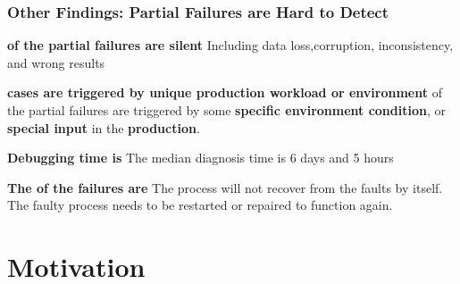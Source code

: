\documentclass[aspectratio=169]{beamer}
\newcommand{\red}[1]{{\color{red}{#1}}}
\begin{document}
\begin{frame}
    \frametitle{Other Findings: Partial Failures are Hard to Detect}
    \begin{block}{\textbf{\red{15\%} of the partial failures are silent}}
        Including data loss,corruption, inconsistency, and wrong results
    \end{block}

    \begin{block}{\textbf{\red{Most} cases are triggered by unique production workload or environment}}
        \red{71\%} of the partial failures are triggered by some \textbf{specific
            environment condition}, or \textbf{special input} in the \textbf{production}.
    \end{block}

    \begin{block}{\textbf{Debugging time is \red{long}}}
        The median diagnosis time is 6 days and 5 hours
    \end{block}

    \begin{block}{\textbf{The \red{majority (68\%)} of the failures are \red{“sticky”}}}
        The process will not recover from the faults by itself. The faulty process needs to be restarted or repaired to function again.
    \end{block}
\end{frame}

\section{Motivation}
\end{document}
